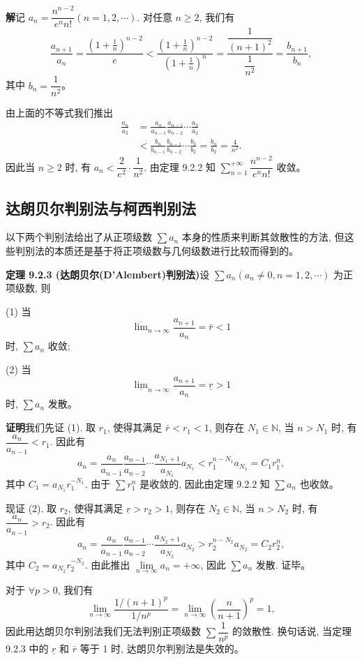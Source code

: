 \documentclass[UTF8, 12pt, fontset=fandol, oneside]{ctexart}
\begin{document}
\noindent\textbf{解}\quad 记 $a_n=\dfrac{n^{n-2}}{e^n n!}(n=1,2,\cdots)$. 对任意 $n\geq2$, 我们有
\[
  \frac{a_{n+1}}{a_n}
  =\frac{\left(1+\frac1n\right)^{n-2}}{e}
  <\frac{\left(1+\frac1n\right)^{n-2}}{\left(1+\frac1n\right)^n}
  =\frac{\dfrac1{(n+1)^2}}{\dfrac1{n^2}}
 =\frac{b_{n+1}}{b_n},
\]
其中 $b_n=\dfrac1{n^2}$。

由上面的不等式我们推出
\[
\begin{aligned}
  \frac{a_n}{a_2}
  &=\frac{a_n}{a_{n-1}}\frac{a_{n-1}}{a_{n-2}}\cdots\frac{a_3}{a_2}\\
  &<\frac{b_n}{b_{n-1}}\frac{b_{n-1}}{b_{n-2}}\cdots\frac{b_3}{b_2}
  =\frac{b_n}{b_2}=\frac4{n^2}.
\end{aligned}
\]
因此当 $n\geq2$ 时, 有 $a_n<\dfrac2{e^2}\cdot\dfrac1{n^2}$. 由定理 9.2.2 知 $\sum\limits_{n=1}^{+\infty}\dfrac{n^{n-2}}{e^n n!}$ 收敛。

\subsection{达朗贝尔判别法与柯西判别法}

以下两个判别法给出了从正项级数 $\sum a_n$ 本身的性质来判断其敛散性的方法, 但这些判别法的本质还是基于将正项级数与几何级数进行比较而得到的。

\noindent\textbf{定理 9.2.3 (达朗贝尔(D'Alembert)判别法)}\quad 设 $\sum a_n(a_n\neq0,n=1,2,\cdots)$ 为正项级数, 则

(1) 当
\[
  \overline{\lim}_{n\to\infty}\frac{a_{n+1}}{a_n}=\bar r<1
\]
时, $\sum a_n$ 收敛;

(2) 当
\[
  \underline{\lim}_{n\to\infty}\frac{a_{n+1}}{a_n}=\underline r>1
\]
时, $\sum a_n$ 发散。

\noindent\textbf{证明}\quad 我们先证 (1). 取 $r_1$, 使得其满足 $\bar r<r_1<1$, 则存在 $N_1\in\mathbb{N}$, 当 $n>N_1$ 时, 有 $\dfrac{a_n}{a_{n-1}}<r_1$. 因此有
\[
  a_n=\frac{a_n}{a_{n-1}}\frac{a_{n-1}}{a_{n-2}}\cdots\frac{a_{N_1+1}}{a_{N_1}}a_{N_1}
  <r_1^{n-N_1}a_{N_1}=C_1r_1^n,
\]
其中 $C_1=a_{N_1}r_1^{-N_1}$. 由于 $\sum r_1^n$ 是收敛的, 因此由定理 9.2.2 知 $\sum a_n$ 也收敛。

现证 (2). 取 $r_2$, 使得其满足 $\underline r>r_2>1$, 则存在 $N_2\in\mathbb{N}$, 当 $n>N_2$ 时, 有 $\dfrac{a_n}{a_{n-1}}>r_2$. 因此有
\[
  a_n=\frac{a_n}{a_{n-1}}\frac{a_{n-1}}{a_{n-2}}\cdots\frac{a_{N_2+1}}{a_{N_2}}a_{N_2}
  >r_2^{n-N_2}a_{N_2}=C_2r_2^n,
\]
其中 $C_2=a_{N_2}r_2^{-N_2}$. 由此推出 $\lim\limits_{n\to\infty}a_n=+\infty$, 因此 $\sum a_n$ 发散. 证毕。

对于 $\forall p>0$, 我们有
\[
  \lim_{n\to\infty}\frac{1/(n+1)^p}{1/n^p}
  =\lim_{n\to\infty}\left(\frac{n}{n+1}\right)^p=1,
\]
因此用达朗贝尔判别法我们无法判别正项级数 $\sum\dfrac1{n^p}$ 的敛散性. 换句话说, 当定理 9.2.3 中的 $\underline r$ 和 $\bar r$ 等于 1 时, 达朗贝尔判别法是失效的。
\end{document}
